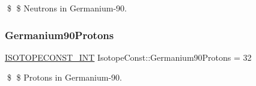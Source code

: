 \$ \$ Neutrons in Germanium-\/90. \mbox{\label{group___isotope_const-_germanium-_ge90_gaa5a9782d05bbbf40ab7de548ad762a7b}} 
\subsubsection{\texorpdfstring{Germanium90\+Protons}{Germanium90Protons}}
{\footnotesize\ttfamily \mbox{\hyperlink{group___isotope_const-_macros_ga5f18360b3e99483a35c32d789e62621c}{I\+S\+O\+T\+O\+P\+E\+C\+O\+N\+S\+T\+\_\+\+I\+NT}} Isotope\+Const\+::\+Germanium90\+Protons = 32}

\$ \$ Protons in Germanium-\/90. 